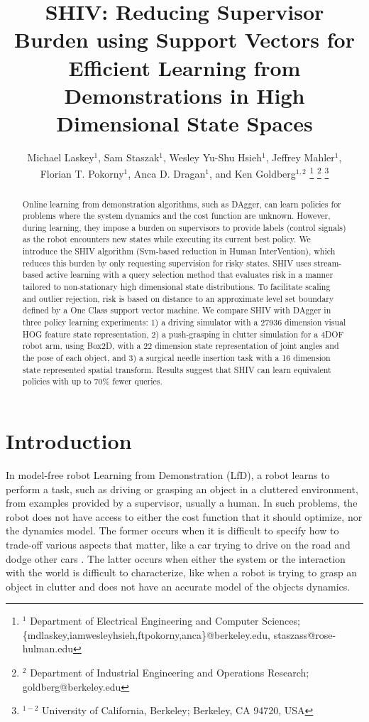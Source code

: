 \documentclass[10pt, conference]{ieeeconf}      %
\title{SHIV: Reducing Supervisor Burden using Support Vectors for Efficient
Learning from Demonstrations in High Dimensional State Spaces }
\author{Michael Laskey$^1$, Sam Staszak$^1$, Wesley Yu-Shu Hsieh$^1$, Jeffrey Mahler$^1$, \\ Florian T. Pokorny$^1$, Anca D. Dragan$^1$, and Ken Goldberg$^{1,2}$%
\thanks{$^1$ Department of Electrical Engineering and Computer Sciences; {\small \{mdlaskey,iamwesleyhsieh,ftpokorny,anca\}@berkeley.edu, \small staszass@rose-hulman.edu} }%
\thanks{$^2$ Department of Industrial Engineering and Operations Research; {\small goldberg@berkeley.edu}}%
\thanks{$^{1-2}$ University of California, Berkeley;  Berkeley, CA 94720, USA}%
}
\begin{document}
\maketitle
\thispagestyle{empty}
\pagestyle{empty}



\begin{abstract}
Online learning from demonstration algorithms, such as DAgger, can learn policies for problems where the system
dynamics and the cost function are unknown. However, during learning, they impose a burden on supervisors to provide labels (control
signals) as the robot encounters new states while executing its current best policy. We introduce the SHIV
algorithm (Svm-based reduction in Human InterVention), which reduces this burden by only requesting supervision for risky states. SHIV uses stream-based active learning with a query selection method that evaluates risk in a manner tailored to non-stationary high dimensional state distributions.  To facilitate scaling and outlier rejection, risk is based on distance to an approximate level set boundary defined by a One Class support vector machine.  We compare SHIV with DAgger in three policy learning experiments: 1) a driving simulator with a 27936 dimension visual HOG feature state representation, 2) a push-grasping in clutter simulation for a 4DOF robot arm, using Box2D, with a 22 dimension state representation  of joint angles and the pose of each object, and 3) a surgical needle insertion task with a 16 dimension state represented spatial transform.  Results suggest that SHIV can learn equivalent policies with up to 70\% fewer queries.

 \end{abstract}



\section{Introduction} 


In model-free robot Learning from Demonstration (LfD), a robot learns to perform a task, such as driving or grasping an object in a cluttered environment, from examples provided by a  supervisor, usually a human.  In such problems, the robot does not have access to either the cost function that it should optimize, nor the dynamics model. The former occurs when it is difficult to specify how to trade-off various aspects that matter, like a car trying to drive on the road and dodge other cars \cite{abbeel2004apprenticeship}.  The latter occurs when either the system or the interaction with the world is difficult to characterize, like when a robot is trying to grasp an object in clutter and does not have an accurate model of the objects dynamics. 
\end{document}

